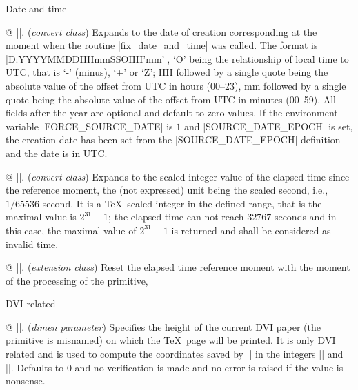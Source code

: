 \enddiv %

\begindiv Date and time

@ |\creationdate|. ({\sl convert class})\enskip
Expands to the date of creation corresponding at the moment when
the routine |fix_date_and_time| was called.
The format is |D:YYYYMMDDHHmmSSOHH'mm'|,
`O' being the relationship of local time to UTC, that is `-' (minus),
`+' or `Z'; HH followed by a single quote being the absolute value
of the offset from UTC in hours (00--23), mm followed by a single
quote being the absolute value of the offset from UTC in minutes
(00--59). All fields after the year are optional and default to
zero values. If the environment variable |FORCE_SOURCE_DATE| is $1$
and |SOURCE_DATE_EPOCH| is set, the creation date has been set from
the |SOURCE_DATE_EPOCH| definition and the date is in UTC.


@ |\elapsedtime|. ({\sl convert class})\enskip
Expands to the scaled integer value of the elapsed time since the
reference moment, the (not expressed) unit being the scaled second, i.e.,
$1/65536$ second. It is a \TeX\ scaled integer in the defined range,
that is the maximal value is $2^{31}-1$; the elapsed time can not
reach $32767$ seconds and in this case, the maximal value of $2^{31}-1$
is returned and shall be considered as invalid time.


@ |\resettimer|. ({\sl extension class})\enskip
Reset the elapsed time reference moment with the moment of the
processing of the primitive,


\enddiv %

\begindiv DVI related

@ |\pageheight|. ({\sl dimen parameter})\enskip
Specifies the height of the current DVI paper (the primitive is
misnamed) on which the \TeX\ page will be printed. It is only
DVI related and is used to compute the coordinates saved by |\savepos|
in the integers |\lastxpos| and |\lastypos|. Defaults to $0$ and
no verification is made and no error is raised if the value is
nonsense.
 
